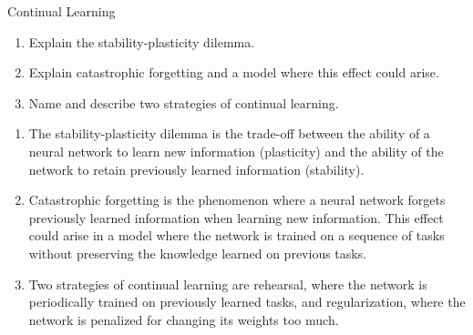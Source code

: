 \documentclass{article}
\begin{document}
\begin{exercise}{Continual Learning}
  \begin{enumerate}
    \item Explain the stability-plasticity dilemma.
    \item Explain catastrophic forgetting and a model where this effect could arise.
    \item Name and describe two strategies of continual learning.
  \end{enumerate}

  \begin{solution}
    \begin{enumerate}
      \item The stability-plasticity dilemma is the trade-off between the ability of a neural network to learn new information (plasticity) and the ability of the network to retain previously learned information (stability).
      \item Catastrophic forgetting is the phenomenon where a neural network forgets previously learned information when learning new information. This effect could arise in a model where the network is trained on a sequence of tasks without preserving the knowledge learned on previous tasks.
      \item Two strategies of continual learning are rehearsal, where the network is periodically trained on previously learned tasks, and regularization, where the network is penalized for changing its weights too much.
    \end{enumerate}
  \end{solution}
\end{exercise}
\end{document}

